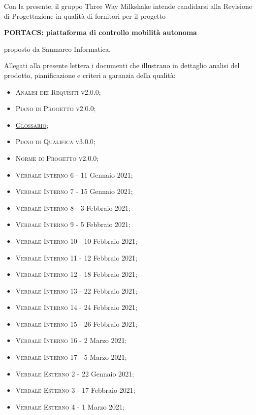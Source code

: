 \documentclass[10pt,stdletter,dateno,sigright]{newlfm}  %
\begin{document}
    \begin{newlfm}

		
        Con la presente, il gruppo Three Way Milkshake intende candidarsi alla Revisione di Progettazione in qualità di fornitori per il progetto
        \begin{center}
            \textbf{PORTACS: piattaforma di controllo mobilità autonoma}
        \end{center}
        proposto da Sanmarco Informatica.

        Allegati alla presente lettera i documenti che illustrano in dettaglio analisi del prodotto, pianificazione e criteri a garanzia della qualità:
	\begin{multicols}{2}
        \begin{itemize}
            \item \textsc{Analisi dei Requisiti v2.0.0;}
            \item \textsc{Piano di Progetto v2.0.0;}
            \item \textsc{\href{https://github.com/Three-Way-Milkshake/docs/wiki/Glossario}{Glossario};}
            \item \textsc{Piano di Qualifica v3.0.0;}
            \item \textsc{Norme di Progetto v2.0.0;}
            \item \textsc{Verbale Interno 6} - 11 Gennaio 2021;
            \item \textsc{Verbale Interno 7} - 15 Gennaio 2021;
            \item \textsc{Verbale Interno 8} - 3 Febbraio 2021;
            \item \textsc{Verbale Interno 9} - 5 Febbraio 2021;
            \item \textsc{Verbale Interno 10} - 10 Febbraio 2021;
            \item \textsc{Verbale Interno 11} - 12 Febbraio 2021;
            \item \textsc{Verbale Interno 12} - 18 Febbraio 2021;
            \item \textsc{Verbale Interno 13} - 22 Febbraio 2021;
            \item \textsc{Verbale Interno 14} - 24 Febbraio 2021;
            \item \textsc{Verbale Interno 15} - 26 Febbraio 2021;
            \item \textsc{Verbale Interno 16} - 2 Marzo 2021;
            \item \textsc{Verbale Interno 17} - 5 Marzo 2021;
            \item \textsc{Verbale Esterno 2} - 22 Gennaio 2021;
            \item \textsc{Verbale Esterno 3} - 17 Febbraio 2021;
            \item \textsc{Verbale Esterno 4} - 1 Marzo 2021;
        \end{itemize}
    \end{multicols}



\end{newlfm}
\end{document}
